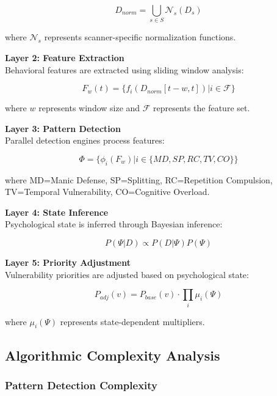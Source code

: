 \documentclass[11pt,a4paper]{article}
\begin{document}
\begin{equation}
D_{norm} = \bigcup_{s \in S} \mathcal{N}_s(D_s)
\end{equation}

where $\mathcal{N}_s$ represents scanner-specific normalization functions.

\textbf{Layer 2: Feature Extraction}\\
Behavioral features are extracted using sliding window analysis:

\begin{equation}
F_w(t) = \{f_i(D_{norm}[t-w, t]) | i \in \mathcal{F}\}
\end{equation}

where $w$ represents window size and $\mathcal{F}$ represents the feature set.

\textbf{Layer 3: Pattern Detection}\\
Parallel detection engines process features:

\begin{equation}
\Phi = \{\phi_i(F_w) | i \in \{MD, SP, RC, TV, CO\}\}
\end{equation}

where MD=Manic Defense, SP=Splitting, RC=Repetition Compulsion, TV=Temporal Vulnerability, CO=Cognitive Overload.

\textbf{Layer 4: State Inference}\\
Psychological state is inferred through Bayesian inference:

\begin{equation}
P(\Psi|D) \propto P(D|\Psi) P(\Psi)
\end{equation}

\textbf{Layer 5: Priority Adjustment}\\
Vulnerability priorities are adjusted based on psychological state:

\begin{equation}
P_{adj}(v) = P_{base}(v) \cdot \prod_{i} \mu_i(\Psi)
\end{equation}

where $\mu_i(\Psi)$ represents state-dependent multipliers.

\subsection{Algorithmic Complexity Analysis}

\subsubsection{Pattern Detection Complexity}
\end{document}

